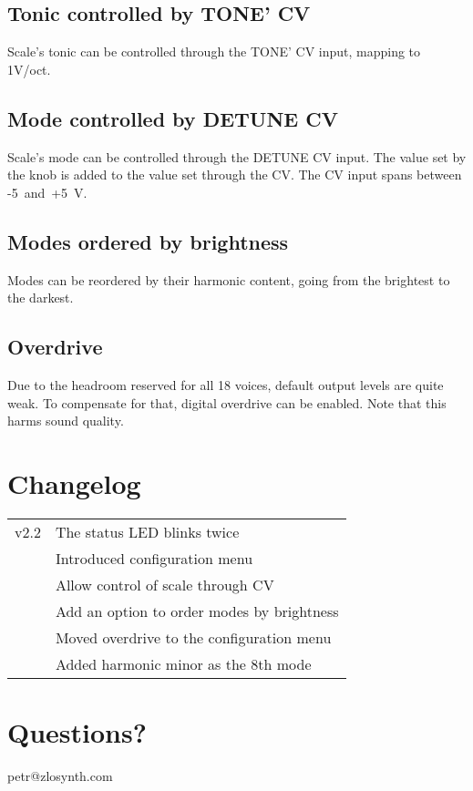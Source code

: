 \documentclass[10pt,nofoldmark,nocombine]{leaflet} %
\begin{document}
\subsection{Tonic controlled by TONE' CV}

Scale's tonic can be controlled through the TONE' CV input, mapping to 1V/oct.

\subsection{Mode controlled by DETUNE CV}

Scale's mode can be controlled through the DETUNE CV input. The value set by the knob is added to the value set through the CV. The CV input spans between -5~and~+5~V.

\subsection{Modes ordered by brightness}

Modes can be reordered by their harmonic content, going from the brightest to the darkest.

\subsection{Overdrive}

Due to the headroom reserved for all 18 voices, default output levels are quite weak. To compensate for that, digital overdrive can be enabled. Note that this harms sound quality.

\section{Changelog}

\begin{tabular}{@{}rl@{}}
  v2.2 & The status LED blinks twice \\
       & Introduced configuration menu \\
       & Allow control of scale through CV \\
       & Add an option to order modes by brightness \\
       & Moved overdrive to the configuration menu \\
       & Added harmonic minor as the 8th mode
\end{tabular}

\section{Questions?}

\begin{center}
petr@zlosynth.com
\end{center}
\end{document}
